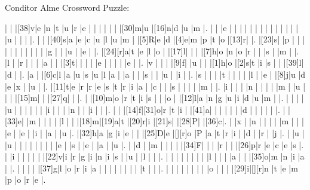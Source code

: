 \documentclass[12pt]{article}
\begin{document}
\libertine
\renewcommand\PuzzleClueFont{\rm\normalsize}
\begin{center}
  \huge{Conditor Alme Crossword Puzzle:}
\end{center}
\vspace{1.5cm}
\begin{Puzzle}{22}{24}
  |{}  |{}  |[38]v|e   |n   |t   |u   |r   |e   |{}  |{}  |{}  |{}  |{}  |{}  |[30]m|u   |[16]n|d   |u   |m   |.
  |{}  |{}  |e   |{}  |{}  |{}  |{}  |{}  |{}  |{}  |{}  |{}  |{}  |{}  |{}  |{}  |{}  |u   |{}  |{}  |{}  |.
  |{}  |{}  |[40]s|a   |e   |c   |u   |l   |u   |m   |{}  |[5]R|e   |d   |[4]e|m   |p   |t   |o   |[13]r|{}  |.
  |[23]s|{}  |p   |{}  |{}  |{}  |{}  |{}  |{}  |{}  |{}  |{}  |{}  |{}  |g   |{}  |{}  |u   |{}  |e   |{}  |.
  |[24][r]a|t   |e   |l   |o   |{}  |[17]l|{}  |{}  |{}  |[7]h|o   |n   |o   |r   |{}  |{}  |s   |{}  |m   |{}  |.
  |l   |{}  |r   |{}  |{}  |{}  |a   |{}  |{}  |[3]t|{}  |{}  |{}  |{}  |e   |{}  |{}  |{}  |{}  |e   |{}  |.
  |v   |{}  |{}  |{}  |[9]f|{}  |u   |{}  |{}  |[1]h|o   |[2]s|t   |i   |s   |{}  |{}  |[39]l|{}  |d   |{}  |.
  |a   |{}  |[6]c|l   |a   |u   |s   |u   |l   |a   |{}  |a   |{}  |{}  |s   |{}  |{}  |u   |{}  |i   |{}  |.
  |s   |{}  |{}  |{}  |t   |{}  |{}  |{}  |{}  |l   |{}  |e   |{}  |[8]j|u   |d   |e   |x   |{}  |u   |{}  |.
  |[11]t|e   |r   |r   |e   |s   |t   |r   |i   |a   |{}  |c   |{}  |{}  |s   |{}  |{}  |{}  |{}  |m   |{}  |.
  |i   |{}  |{}  |{}  |n   |{}  |{}  |{}  |{}  |m   |{}  |u   |{}  |{}  |{}  |[15]m|{}  |{}  |[27]q|{}  |{}  |.
  |{}  |[10]m|o   |r   |t   |i   |s   |{}  |{}  |o   |{}  |[12]l|a   |n   |g   |u   |i   |d   |u   |m   |{}  |.
  |{}  |{}  |{}  |{}  |u   |{}  |{}  |{}  |{}  |{}  |{}  |i   |{}  |{}  |{}  |n   |{}  |{}  |i   |{}  |{}  |.
  |{}  |{}  |[14]f|[31]o|r   |t   |i   |{}  |[41]a|{}  |{}  |{}  |{}  |{}  |{}  |d   |{}  |{}  |{}  |{}  |{}  |.
  |{}  |[33]e|{}  |m   |{}  |{}  |{}  |{}  |l   |{}  |{}  |[18]m|[19]a|t   |[20]r|i   |[21]s|{}  |[28]P|{}  |[36]c|.
  |{}  |x   |{}  |n   |{}  |{}  |{}  |{}  |m   |{}  |{}  |{}  |e   |{}  |e   |{}  |i   |{}  |a   |{}  |u   |.
  |[32]h|a   |g   |i   |e   |{}  |{}  |[25]D|e   |[][r]o   |P   |a   |t   |r   |i   |{}  |d   |{}  |r   |{}  |j   |.
  |{}  |u   |{}  |u   |{}  |{}  |{}  |{}  |{}  |{}  |{}  |{}  |e   |{}  |s   |{}  |e   |{}  |a   |{}  |u   |.
  |{}  |d   |{}  |m   |{}  |{}  |{}  |{}  |[34]F|{}  |{}  |{}  |r   |{}  |{}  |[26]p|r   |e   |c   |e   |s   |.
  |{}  |i   |{}  |{}  |{}  |{}  |{}  |[22]v|i   |r   |g   |i   |n   |i   |s   |{}  |u   |{}  |l   |{}  |{}  |.
  |{}  |{}  |{}  |{}  |{}  |{}  |{}  |{}  |l   |{}  |{}  |{}  |a   |{}  |{}  |[35]o|m   |n   |i   |a   |{}  |.
  |{}  |{}  |{}  |{}  |[37]g|l   |o   |r   |i   |a   |{}  |{}  |{}  |{}  |{}  |{}  |{}  |{}  |t   |{}  |{}  |.
  |{}  |{}  |{}  |{}  |{}  |{}  |{}  |{}  |o   |{}  |{}  |{}  |[29]i|[][r]n   |t   |e   |m   |p   |o   |r   |e   |.
\end{Puzzle}
\end{document}
